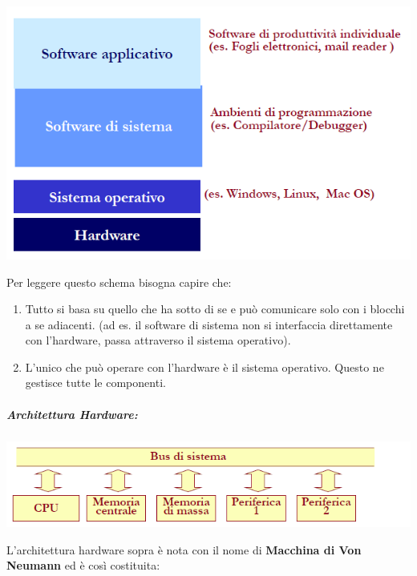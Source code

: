 \documentclass[
  paper=a4,
  oneside  ,captions=tableheading
]{scrbook}
\providecommand{\tightlist}{%
  \setlength{\itemsep}{0pt}\setlength{\parskip}{0pt}}
\begin{document}
\includegraphics{./image/image-20201111172243268.png}

Per leggere questo schema bisogna capire che:

\begin{enumerate}
\def\labelenumi{\arabic{enumi}.}
\tightlist
\item
  Tutto si basa su quello che ha sotto di se e può comunicare solo con i
  blocchi a se adiacenti. (ad es. il software di sistema non si
  interfaccia direttamente con l'hardware, passa attraverso il sistema
  operativo).
\item
  L'unico che può operare con l'hardware è il sistema operativo. Questo
  ne gestisce tutte le componenti.
\end{enumerate}

\hypertarget{architettura-hardware}{%
\subparagraph{Architettura Hardware:}\label{architettura-hardware}}

\includegraphics{./image/image-20201111172642835.png}

L'architettura hardware sopra è nota con il nome di \textbf{Macchina di
Von Neumann} ed è così costituita:
\end{document}
